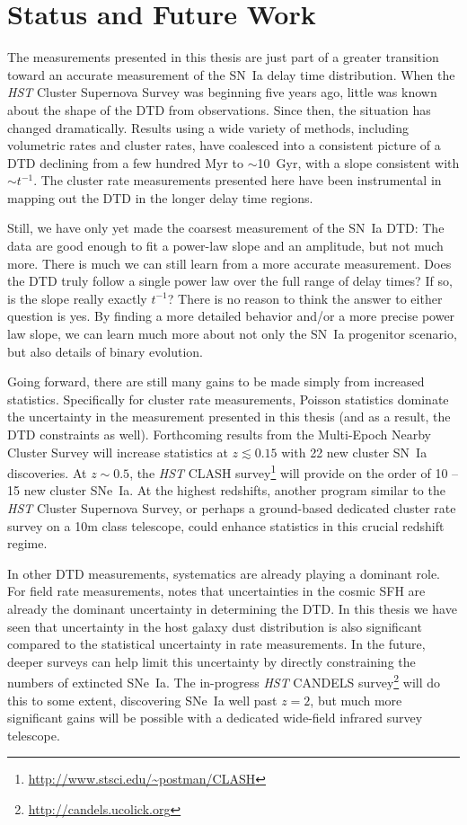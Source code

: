 \section{Status and Future Work}

The measurements presented in this thesis are just part of a greater
transition toward an accurate measurement of the SN~Ia delay time
distribution. When the \emph{HST} Cluster Supernova Survey was
beginning five years ago, little was known about the shape of the DTD
from observations. Since then, the situation has changed
dramatically. Results using a wide variety of methods, including
volumetric rates and cluster rates, have coalesced into a consistent
picture of a DTD declining from a few hundred Myr to $\sim$10~Gyr,
with a slope consistent with $\sim$$t^{-1}$. The cluster rate
measurements presented here have been instrumental in mapping out the
DTD in the longer delay time regions.

Still, we have only yet made the coarsest measurement of the SN~Ia
DTD: The data are good enough to fit a power-law slope and an
amplitude, but not much more. There is much we can still learn from a
more accurate measurement. Does the DTD truly follow a single power
law over the full range of delay times? If so, is the slope really
exactly $t^{-1}$? There is no reason to think the answer to either
question is yes. By finding a more detailed behavior and/or a more
precise power law slope, we can learn much more about not only the
SN~Ia progenitor scenario, but also details of binary evolution.

Going forward, there are still many gains to be made simply from
increased statistics. Specifically for cluster rate measurements,
Poisson statistics dominate the uncertainty in the measurement
presented in this thesis (and as a result, the DTD constraints as
well). Forthcoming results from the Multi-Epoch Nearby Cluster
Survey \citep{sand08a,sand10a} will increase statistics at $z \lesssim
0.15$ with 22 new cluster SN~Ia discoveries. At $z \sim 0.5$, the
\emph{HST} CLASH survey\footnote{\url{http://www.stsci.edu/~postman/CLASH}} will
provide on the order of 10 -- 15 new cluster SNe~Ia. At the highest
redshifts, another program similar to the \emph{HST} Cluster Supernova
Survey, or perhaps a ground-based dedicated cluster rate survey on a
10m class telescope, could enhance statistics in this crucial redshift
regime.

In other DTD measurements, systematics are already playing a dominant
role. For field rate measurements, \citet{graur11a} notes that
uncertainties in the cosmic SFH are already the dominant uncertainty
in determining the DTD. In this thesis we have seen that uncertainty
in the host galaxy dust distribution is also significant compared to
the statistical uncertainty in rate measurements. In the future,
deeper surveys can help limit this uncertainty by directly
constraining the numbers of extincted SNe~Ia. The
in-progress \emph{HST} CANDELS
survey\footnote{\url{http://candels.ucolick.org}} will do this to some
extent, discovering SNe~Ia well past $z=2$, but much more significant
gains will be possible with a dedicated wide-field infrared survey
telescope.


